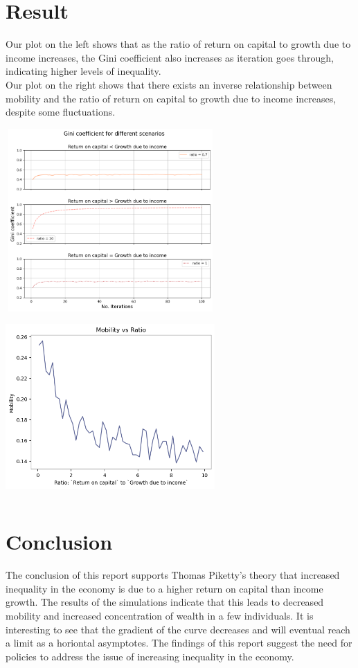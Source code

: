 \documentclass{article}
\begin{document}
\section*{Result}
\vspace{-0.3cm}

Our plot on the left shows that as the ratio of return on capital to growth due to income increases, 
the Gini coefficient also increases as iteration goes through, indicating higher levels of inequality. \\
Our plot on the right shows that there exists an inverse relationship between mobility and the ratio of return on capital to growth due to income increases, despite some fluctuations. 

\vspace{0.3cm}
\includegraphics[width=8cm,height=7cm]{ratio_comparison.png}
\hspace{0.2cm}
\includegraphics[width=8cm,height=7cm]{Mobility.png}

\vspace{-0.4cm}
\section*{Conclusion}
The conclusion of this report supports Thomas Piketty's theory that increased inequality in the economy is due to a higher
return on capital than income growth.
The results of the simulations indicate that this leads to decreased mobility and increased 
concentration of wealth in a few individuals. It is interesting to see that the gradient of the curve decreases and will eventual reach a limit as a horiontal asymptotes. The findings of this report suggest the need for policies to 
address the issue of increasing inequality in the economy.
\end{document}

